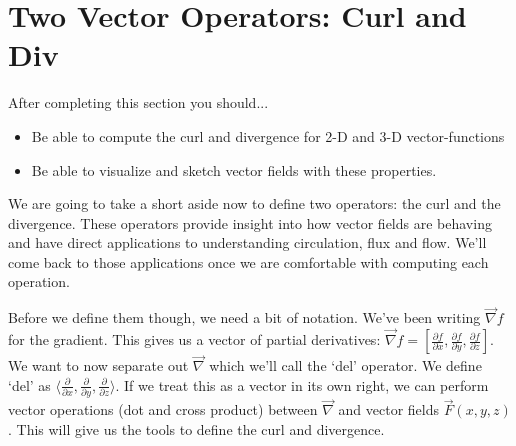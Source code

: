 \documentclass[10pt,]{book}
\theoremstyle{plain}
\theoremstyle{definition}
\theoremstyle{definition}
\theoremstyle{definition}
\theoremstyle{definition}
\theoremstyle{definition}
\numberwithin{equation}{section}
\begin{document}
\section[{Two Vector Operators: Curl and Div}]{Two Vector Operators: Curl and Div}\label{section-44}
After completing this section you should... \leavevmode%
\begin{itemize}[label=\textbullet]
\item{}Be able to compute the curl and divergence for 2-D and 3-D vector-functions%
\item{}Be able to visualize and sketch vector fields with these properties.%
\end{itemize}
%
\par
We are going to take a short aside now to define two operators: the curl and the divergence. These operators provide insight into how vector fields are behaving and have direct applications to understanding circulation, flux and flow. We'll come back to those applications once we are comfortable with computing each operation.%
\par
Before we define them though, we need a bit of notation. We've been writing \(\vec \nabla f\) for the gradient. This gives us a vector of partial derivatives: \(\vec \nabla f= \left[ \frac{\partial f}{\partial x},\frac{\partial f}{\partial y},\frac{\partial f}{\partial z}\right]\). We want to now separate out \(\vec \nabla\) which we'll call the `del' operator. We define `del' as \(\langle \frac{\partial}{\partial x},\frac{\partial}{\partial y},\frac{\partial}{\partial z}\rangle\). If we treat this as a vector in its own right, we can perform vector operations (dot and cross product) between \(\vec \nabla\) and vector fields \(\vec{F}(x,y,z)\). This will give us the tools to define the curl and divergence.%
\typeout{************************************************}
\typeout{************************************************}
\end{document}
